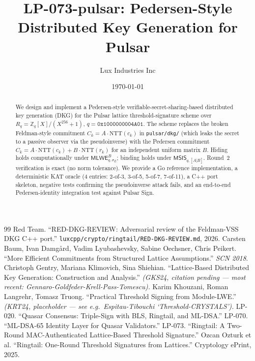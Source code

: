 \documentclass[11pt,a4paper]{article}
\title{LP-073-pulsar: Pedersen-Style Distributed Key Generation for Pulsar}
\author{Lux Industries Inc}
\date{\today}
\begin{document}
\maketitle

\begin{abstract}
We design and implement a Pedersen-style verifiable-secret-sharing-based
distributed key generation (DKG) for the Pulsar lattice threshold-signature
scheme over $R_q = \mathbb{Z}_q[X]/(X^{256}+1)$, $q = \mathtt{0x1000000004A01}$.
The scheme replaces the broken Feldman-style commitment
$C_k = A \cdot \mathrm{NTT}(c_k)$ in \texttt{pulsar/dkg/} (which leaks the
secret to a passive observer via the pseudoinverse) with the
Pedersen commitment $C_k = A \cdot \mathrm{NTT}(c_k) + B \cdot \mathrm{NTT}(r_k)$
for an independent uniform matrix $B$.  Hiding holds computationally under
$\mathsf{MLWE}_{q,\sigma_E}^B$; binding holds under
$\mathsf{MSIS}_{q,[A|B]}$.  Round~2 verification is exact (no norm
tolerance).  We provide a Go reference implementation, a deterministic KAT
oracle (4 entries: 2-of-3, 3-of-5, 5-of-7, 7-of-11), a C++ port skeleton,
negative tests confirming the pseudoinverse attack fails, and an
end-to-end Pedersen-identity integration test against Pulsar Sign.
\end{abstract}

\providecommand{\luxref}[1]{[#1]}



\begin{thebibliography}{99}
Red Team.  ``RED-DKG-REVIEW: Adversarial review of the Feldman-VSS DKG
C++ port.''  \texttt{luxcpp/crypto/ringtail/RED-DKG-REVIEW.md}, 2026.
Carsten Baum, Ivan Damg\aa{}rd, Vadim Lyubashevsky, Sabine Oechsner,
Chris Peikert.  ``More Efficient Commitments from Structured Lattice
Assumptions.''  \emph{SCN 2018}.
Christoph Gentry, Mariana Klimovich, Sina Shiehian.
``Lattice-Based Distributed Key Generation: Construction and Analysis.''
\emph{(GKS24, citation pending — most recent: Gennaro-Goldfeder-Krell-Pass-Tomescu).}
Karim Khouzani, Roman Langrehr, Tomasz Truong.
``Practical Threshold Signing from Module-LWE.''
\emph{(KRT24, placeholder — see e.g.\ Espitau-Tibouchi `Threshold-CRYSTALS').}
LP-020. ``Quasar Consensus: Triple-Sign with BLS, Ringtail, and ML-DSA.''
LP-070. ``ML-DSA-65 Identity Layer for Quasar Validators.''
LP-073. ``Ringtail: A Two-Round MAC-Authenticated Lattice-Based Threshold
Signature.''
Ozcan Ozturk et al.  ``Ringtail: One-Round Threshold Signatures from
Lattices.''  Cryptology ePrint, 2025.
\end{thebibliography}
\end{document}
